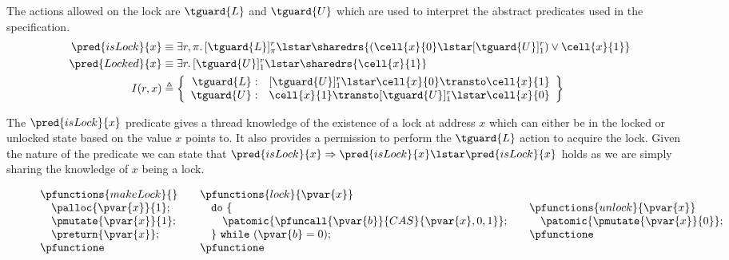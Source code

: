 The actions allowed on the lock are $\tguard{L}$ and $\tguard{U}$ which are used to interpret the abstract predicates used in the specification.
\begin{align*}
\pred{isLock}{x} &\equiv \exists r, \pi \ldotp [\tguard{L}]_\pi^r \lstar \sharedrs{(\cell{x}{0} \lstar [\tguard{U}]_1^r) \lor \cell{x}{1}}
\\
\pred{Locked}{x} &\equiv \exists r \ldotp [\tguard{U}]_1^r \lstar \sharedrs{\cell{x}{1}}
\\
I(r, x) &\triangleq 
\left\lbrace
\begin{array}{rl}
\tguard{L}: & [\tguard{U}]_1^r \lstar \cell{x}{0} \transto \cell{x}{1} \\
\tguard{U}: & \cell{x}{1} \transto [\tguard{U}]_1^r \lstar \cell{x}{0}
\end{array}
\right\rbrace
\end{align*}

The $\pred{isLock}{x}$ predicate gives a thread knowledge of the existence of a lock at address $x$ which can either be in the locked or unlocked state based on the value $x$ points to. It also provides a permission to perform the $\tguard{L}$ action to acquire the lock. Given the nature of the predicate we can state that $\pred{isLock}{x} \Rightarrow \pred{isLock}{x} \lstar \pred{isLock}{x}$ holds as we are simply sharing the knowledge of $x$ being a lock.

\begin{figure}[h]
\[
\begin{array}{@{}l@{\qquad}l@{\qquad}l@{}}
	\begin{array}{@{}l@{}}
	\pfunctions{makeLock}{} \\
		\quad \palloc{\pvar{x}}{1}; \\
		\quad \pmutate{\pvar{x}}{1}; \\
		\quad \preturn{\pvar{x}}; \\
	\pfunctione
	\end{array}
	&
	\begin{array}{@{}l@{}}
	\pfunctions{lock}{\pvar{x}} \\
		\quad \mathtt{do}\ \{ \\
			\quad \quad \patomic{\pfuncall{\pvar{b}}{CAS}{\pvar{x}, 0, 1}}; \\
		\quad \}\ \mathtt{while}\ (\pvar{b} = 0); \\
	\pfunctione
	\end{array}
	&
	\begin{array}{@{}l@{}}
	\pfunctions{unlock}{\pvar{x}} \\
		\quad \patomic{\pmutate{\pvar{x}}{0}}; \\
	\pfunctione
	\end{array}
\end{array}
\]
\label{fig:spinlock}
\end{figure}

